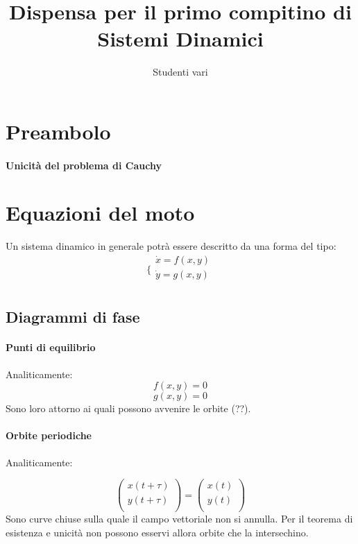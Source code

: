 \documentclass[a4paper,12pt]{article}
\begin{document}
\begin{titlepage}
\title{Dispensa per il primo compitino di Sistemi Dinamici}
\author{Studenti vari}
\maketitle
\end{titlepage}
\begin{titlepage}
\tableofcontents
\end{titlepage}

\section{Preambolo}
\paragraph{Unicità del problema di Cauchy}

\section{Equazioni del moto}

Un sistema dinamico in generale potrà essere descritto da una forma del tipo:
$$\bigg\{ \begin{array}{l}
\dot{x} = f(x, y)\\
\dot{y} = g(x, y)\\
\end{array}$$

\subsection{Diagrammi di fase}
\paragraph{Punti di equilibrio} Analiticamente:
$$f(x, y) = 0$$ $$g(x, y) = 0$$
Sono loro attorno ai quali possono avvenire le orbite (??).
\paragraph{Orbite periodiche}
Analiticamente:

$$
\begin{pmatrix}
x(t+\tau) \\ y(t+\tau)\\
\end{pmatrix}
=
\begin{pmatrix}
x(t) \\ y(t)\\
\end{pmatrix}   
$$
Sono curve chiuse sulla quale il campo vettoriale non si annulla.
Per il teorema di esistenza e unicità non possono esservi allora orbite che la intersechino.
\end{document}
